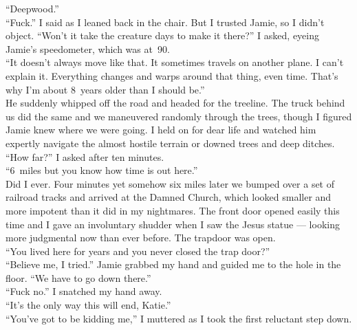 \documentclass[a5paper]{scrartcl}
\begin{document}
\enquote{Deepwood.}\\


\enquote{Fuck.} I said as I leaned back in the chair. But I trusted Jamie, so I didn't object.  \enquote{Won't it take the creature days to make it there?} I asked, eyeing Jamie's speedometer, which was at~90. \\


\enquote{It doesn't always move like that. It sometimes travels on another plane. I can't explain it. Everything changes and warps around that thing, even time. That's why I'm about 8~years older than I should be.}\\


He suddenly whipped off the road and headed for the treeline. The truck behind us did the same and we maneuvered randomly through the trees, though I figured Jamie knew where we were going. I held on for dear life and watched him expertly navigate the almost hostile terrain or downed trees and deep ditches. \\


\enquote{How far?} I asked after ten minutes.\\


\enquote{6~miles but you know how time is out here.} \\


Did I ever. Four minutes yet somehow six miles later we bumped over a set of railroad tracks and arrived at the Damned Church, which looked smaller and more impotent than it did in my nightmares. The front door opened easily this time and I gave an involuntary shudder when I saw the Jesus statue --- looking more judgmental now than ever before. The trapdoor was open.\\


\enquote{You lived here for years and you never closed the trap door?} \\


\enquote{Believe me, I tried.} Jamie grabbed my hand and guided me to the hole in the floor. \enquote{We have to go down there.}\\


\enquote{Fuck no.} I snatched my hand away.\\


\enquote{It's the only way this will end, Katie.}\\


\enquote{You've got to be kidding me,} I muttered as I took the first reluctant step down.\\
\end{document}
